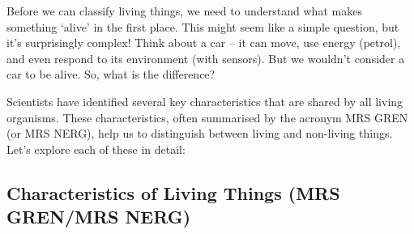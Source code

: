 \FloatBarrier

Before we can classify living things, we need to understand what makes something ‘alive’ in the first place.  This might seem like a simple question, but it's surprisingly complex!  Think about a car – it can move, use energy (petrol), and even respond to its environment (with sensors).  But we wouldn’t consider a car to be alive.  So, what is the difference?

Scientists have identified several key characteristics that are shared by all living organisms. These characteristics, often summarised by the acronym MRS GREN (or MRS NERG), help us to distinguish between living and non-living things. Let's explore each of these in detail:

\subsection{Characteristics of Living Things (MRS GREN/MRS NERG)}


